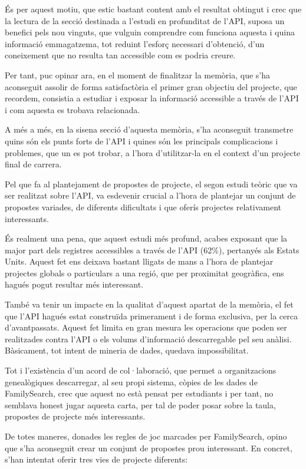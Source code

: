     És per aquest motiu, que estic bastant content amb el resultat obtingut i crec que la lectura de la secció destinada a l’estudi en profunditat de l’API, suposa un benefici pels nou vinguts, que vulguin comprendre com funciona aquesta i quina informació emmagatzema, tot reduint l’esforç necessari d’obtenció, d’un coneixement que no resulta tan accessible com es podria creure.

    Per tant, puc opinar ara, en el moment de finalitzar la memòria, que s’ha aconseguit assolir de forma satisfactòria el primer gran objectiu del projecte, que recordem, consistia a estudiar i exposar la informació accessible a través de l’API i com aquesta es trobava relacionada.

    A més a més, en la sisena secció d'aquesta memòria, s'ha aconseguit transmetre quins són els punts forts de l'API i quines són les principals complicacions i problemes, que un es pot trobar, a l'hora d'utilitzar-la en el context d'un projecte final de carrera.

    Pel que fa al plantejament de propostes de projecte, el segon estudi teòric que va ser realitzat sobre l’API, va esdevenir crucial a l’hora de plantejar un conjunt de propostes variades, de diferents dificultats i que oferís projectes relativament inte\-re\-ssants.

    És realment una pena, que aquest estudi més profund, acabes exposant que la major part dels registres accessibles a través de l’API (62\%), pertanyés als Estats Units. Aquest fet ens deixava bastant lligats de mans a l’hora de plantejar projectes globals o particulars a una regió, que per proximitat geogràfica, ens hagués pogut resultar més interessant.

    També va tenir un impacte en la qualitat d’aquest apartat de la memòria, el fet que l’API hagués estat construïda primerament i de forma exclusiva, per la cerca d’avantpassats. Aquest fet limita en gran mesura les operacions que poden ser realitzades contra l’API o els volums d’informació descarregable pel seu anàlisi. Bàsicament, tot intent de mineria de dades, quedava impossibilitat.

    Tot i l’existència d’un acord de col·laboració, que permet a organitzacions genealògiques descarregar, al seu propi sistema, còpies de les dades de FamilySearch, crec que aquest no està pensat per estudiants i per tant, no semblava honest jugar aquesta carta, per tal de poder posar sobre la taula, propostes de projecte més interessants.

    De totes maneres, donades les regles de joc marcades per FamilySearch, opino que s’ha aconseguit crear un conjunt de propostes prou interessant. En concret, s’han intentat oferir tres vies de projecte diferents:


